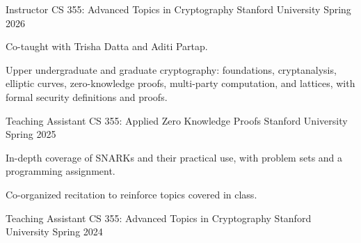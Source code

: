\Needspace{8cm}

\begin{cventries}

  \cventry
    {Instructor\quad{}}
    {CS 355: Advanced Topics in Cryptography}
    {Stanford University}
    {Spring 2026}
    {
      \begin{cvitems}
        \item{Co-taught with Trisha Datta and Aditi Partap.}
        \item{Upper undergraduate and graduate cryptography: foundations, cryptanalysis, elliptic curves, zero-knowledge proofs, multi-party computation, and lattices, with formal security definitions and proofs.}
      \end{cvitems}
    }

  \cventry
    {Teaching Assistant\quad{}}
    {CS 355: Applied Zero Knowledge Proofs}
    {Stanford University}
    {Spring 2025}
    {
      \begin{cvitems}
        \item{In-depth coverage of SNARKs and their practical use, with problem sets and a programming assignment.}
        \item{Co-organized recitation to reinforce topics covered in class.}
      \end{cvitems}
    }

  \cventry
    {Teaching Assistant\quad{}}
    {CS 355: Advanced Topics in Cryptography}
    {Stanford University}
    {Spring 2024}
    {}

\end{cventries}
